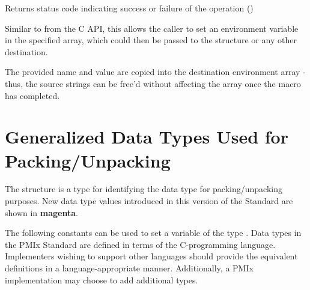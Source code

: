 Returns status code indicating success or failure of the operation ()

\descr

Similar to  from the C API, this allows the caller to set an environment variable in the specified  array, which could then be passed to the  structure or any other destination.

\adviceuserstart
The provided name and value are copied into the destination environment array - thus, the source strings can be free'd without affecting the array once the macro has completed.
\adviceuserend


\section{Generalized Data Types Used for Packing/Unpacking}

The  structure is a  type for identifying the data type for packing/unpacking purposes. New data type values introduced in this version of the Standard are shown in \textbf{\color{magenta}magenta}.

\adviceimplstart
The following constants can be used to set a variable of the type . Data types in the \ac{PMIx} Standard are defined in terms of the C-programming language. Implementers wishing to support other languages should provide the equivalent definitions in a language-appropriate manner. Additionally, a PMIx implementation may choose to add additional types.
\adviceimplend

